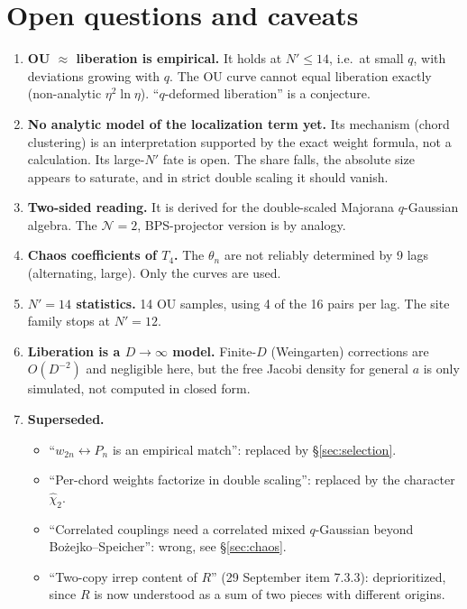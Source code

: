 \documentclass[11pt]{article}
\newcommand{\Np}{N'}
\theoremstyle{remark}
\begin{document}
\section{Open questions and caveats}\label{sec:open}
\begin{enumerate}\itemsep2pt
\item \textbf{OU $\approx$ liberation is empirical.} It holds at $\Np\le14$, i.e.\ at small $q$, with deviations growing with
  $q$. The OU curve cannot equal liberation exactly (non-analytic $\eta^2\ln\eta$). ``$q$-deformed liberation'' is a
  conjecture.
\item \textbf{No analytic model of the localization term yet.} Its mechanism (chord clustering) is an interpretation
  supported by the exact weight formula, not a calculation. Its large-$\Np$ fate is open. The share falls, the absolute
  size appears to saturate, and in strict double scaling it should vanish.
\item \textbf{Two-sided reading.} It is derived for the double-scaled Majorana $q$-Gaussian algebra. The $\mathcal N=2$,
  BPS-projector version is by analogy.
\item \textbf{Chaos coefficients of $T_4$.} The $\theta_n$ are not reliably determined by 9 lags (alternating, large).
  Only the curves are used.
\item \textbf{$\Np=14$ statistics.} 14 OU samples, using 4 of the 16 pairs per lag. The site family stops at $\Np=12$.
\item \textbf{Liberation is a $D\to\infty$ model.} Finite-$D$ (Weingarten) corrections are $O(D^{-2})$ and negligible
  here, but the free Jacobi density for general $a$ is only simulated, not computed in closed form.
\item \textbf{Superseded.}
  \begin{itemize}\itemsep1pt
  \item ``$w_{2n}\leftrightarrow P_n$ is an empirical match'': replaced by \S\ref{sec:selection}.
  \item ``Per-chord weights factorize in double scaling'': replaced by the character $\hat\chi_2$.
  \item ``Correlated couplings need a correlated mixed $q$-Gaussian beyond Bożejko--Speicher'': wrong, see \S\ref{sec:chaos}.
  \item ``Two-copy irrep content of $R$'' (29 September item 7.3.3): deprioritized, since $R$ is now understood as a sum
    of two pieces with different origins.
  \end{itemize}
\end{enumerate}
\end{document}
